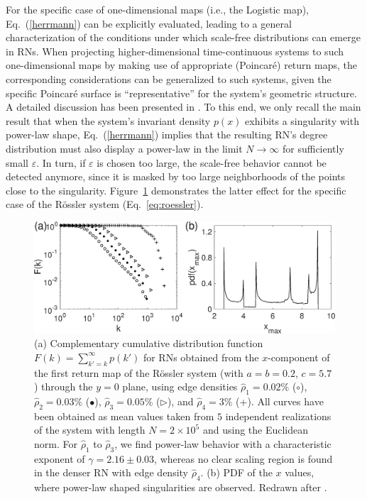 		For the specific case of one-dimensional maps (i.e., the Logistic map), Eq.~(\ref{herrmann}) can be explicitly evaluated, leading to a general characterization of the conditions under which scale-free distributions can emerge in RNs. When projecting higher-dimensional time-continuous systems to such one-dimensional maps by making use of appropriate (Poincar\'e) return maps, the corresponding considerations can be generalized to such systems, given the specific Poincar\'e surface is ``representative'' for the system's geometric structure. A detailed discussion has been presented in \cite{Zou2012}. To this end,  we only recall the main result that when the system's invariant density $p(x)$ exhibits a singularity with power-law shape, Eq.~(\ref{herrmann}) implies that the resulting RN's degree distribution must also display a power-law in the limit $N\to\infty$ for sufficiently small $\varepsilon$. In turn, if $\varepsilon$ is chosen too large, the scale-free behavior cannot be detected anymore, since it is masked by too large neighborhoods of the points close to the singularity. Figure~\ref{fig:roessler_scaling} demonstrates the latter effect for the specific case of the R\"ossler system (Eq.~\ref{eq:roessler}).
\begin{figure}
	\centering
	\includegraphics[width=\columnwidth]{Chapter03_RecurrenceNt/retmap_histP.eps}
	\caption{(a) Complementary cumulative distribution function $F(k)=\sum_{k'=k}^{\infty} p(k')$ for RNs obtained from the $x$-component of the first return map of the R\"ossler system (with $a=b=0.2$, $c=5.7$) through the $y=0$ plane, using edge densities $\hat{\rho}_1 =0.02\%$ ($\circ$), $\hat{\rho}_2 =0.03\%$ ($\bullet$), $\hat{\rho}_3 =0.05\%$ ($\triangleright$), and $\hat{\rho}_4 =3\%$ (+). All curves have been obtained as mean values taken from $5$ independent realizations of the system with length $N=2\times 10^5$ and using the Euclidean norm. For $\hat{\rho}_1$ to $\hat{\rho}_3$, we find power-law behavior with a characteristic exponent of $\gamma=2.16\pm 0.03$, whereas no clear scaling region is found in the denser RN with edge density $\hat{\rho}_4$. (b) PDF of the $x$ values, where power-law shaped singularities are observed. Redrawn after \cite{Zou2012}.}
\label{fig:roessler_scaling}
\end{figure}

